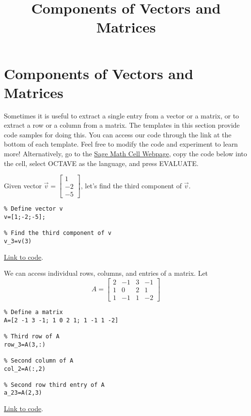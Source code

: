 \documentclass{ximera}
\title{Components of Vectors and Matrices} \license{CC BY-NC-SA 4.0}
\begin{document}
\begin{abstract}
\end{abstract}
\maketitle
\section*{Components of Vectors and Matrices}

Sometimes it is useful to extract a single entry from a vector or a matrix, or to extract a row or a column from a matrix.  The templates in this section provide code samples for doing this. You can access our code through the link at the bottom of each template.  Feel free to modify the code and experiment to learn more!  Alternatively, go to the \href{https://sagecell.sagemath.org/}{Sage Math Cell Webpage}, copy the code below into the cell, select OCTAVE as the language, and press EVALUATE.  

\begin{template}\label{temp:vectorComp}
    Given vector $\vec{v}=\begin{bmatrix}1\\-2\\-5\end{bmatrix}$, let's find the third component of $\vec{v}$.
\begin{verbatim}
% Define vector v
v=[1;-2;-5];

% Find the third component of v
v_3=v(3)
\end{verbatim}

    \href{https://sagecell.sagemath.org/?z=eJxTVXBJTcvMS1UoS00uyS9SKOPlKrONNrTWNbLWNY215uXi5VJVcMvMS1EoyUgF4syiFIXk_NyC_LzUvBKF_DSwhnhj2zINY00AVTYWYw==&lang=octave&interacts=eJyLjgUAARUAuQ==}{Link to code}.
\end{template}

\begin{template}\label{temp:matrixRowColEntry}
    We can access individual rows, columns, and entries of a matrix.  Let $$A=\begin{bmatrix}2 & -1 & 3 & -1\\1 & 0 & 2 & 1\\1 & -1 & 1 & -2\end{bmatrix}$$
\begin{verbatim}
% Define a matrix 
A=[2 -1 3 -1; 1 0 2 1; 1 -1 1 -2]

% Third row of A
row_3=A(3,:)

% Second column of A
col_2=A(:,2)

% Second row third entry of A
a_23=A(2,3)   
\end{verbatim}
\href{https://sagecell.sagemath.org/?z=eJxVjEEKwjAURPeB3GE2BQsR7M-u0kXAG9SdSAhtigGbQIhYb-9v7cbNMDM8XoWLn0L0cJhdyWGBFKa7EY4NNMcZDU4gbIU_DrpLIUWF6yPkETm9kSYYKbhZ3ZmDVm39I3o_pDhiSM_XHHeKhyWmWkX_1Coqm9LHkj877iytTlK6_gIqSCuZ&lang=octave&interacts=eJyLjgUAARUAuQ==}{Link to code}.
\end{template}
\end{document}
